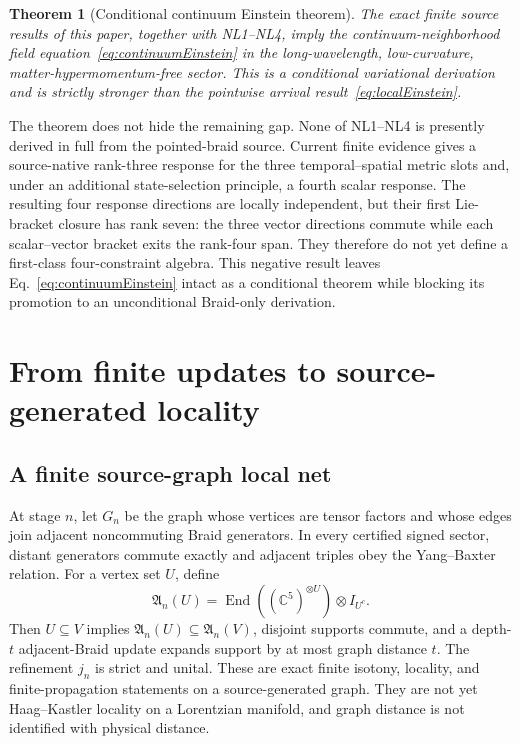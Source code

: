 \documentclass[11pt]{article}
\newtheorem{theorem}{Theorem}[section]
\theoremstyle{definition}
\theoremstyle{remark}
\begin{document}
\begin{theorem}[Conditional continuum Einstein theorem]\label{thm:conditionalEinstein}
The exact finite source results of this paper, together with NL1--NL4, imply the continuum-neighborhood field equation~\eqref{eq:continuumEinstein} in the long-wavelength, low-curvature, matter-hypermomentum-free sector. This is a conditional variational derivation and is strictly stronger than the pointwise arrival result~\eqref{eq:localEinstein}.
\end{theorem}

The theorem does not hide the remaining gap. None of NL1--NL4 is presently derived in full from the pointed-braid source. Current finite evidence gives a source-native rank-three response for the three temporal--spatial metric slots and, under an additional state-selection principle, a fourth scalar response. The resulting four response directions are locally independent, but their first Lie-bracket closure has rank seven: the three vector directions commute while each scalar--vector bracket exits the rank-four span. They therefore do not yet define a first-class four-constraint algebra. This negative result leaves Eq.~\eqref{eq:continuumEinstein} intact as a conditional theorem while blocking its promotion to an unconditional Braid-only derivation.

\section{From finite updates to source-generated locality}

\subsection{A finite source-graph local net}

At stage $n$, let $G_n$ be the graph whose vertices are tensor factors and whose edges join adjacent noncommuting Braid generators. In every certified signed sector, distant generators commute exactly and adjacent triples obey the Yang--Baxter relation. For a vertex set $U$, define
\begin{equation}\label{eq:localnet}
 \mathfrak A_n(U)=\operatorname{End}\!\left((\mathbb C^5)^{\otimes U}\right)\otimes I_{U^c}.
\end{equation}
Then $U\subseteq V$ implies $\mathfrak A_n(U)\subseteq\mathfrak A_n(V)$, disjoint supports commute, and a depth-$t$ adjacent-Braid update expands support by at most graph distance $t$. The refinement $j_n$ is strict and unital. These are exact finite isotony, locality, and finite-propagation statements on a source-generated graph. They are not yet Haag--Kastler locality on a Lorentzian manifold, and graph distance is not identified with physical distance.
\end{document}

